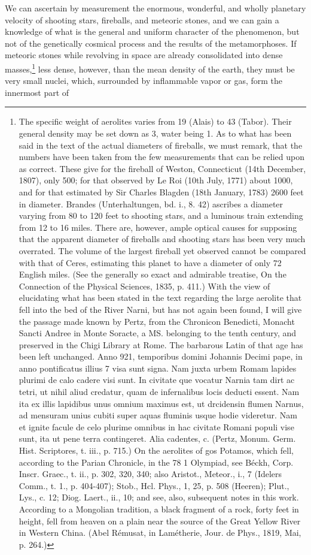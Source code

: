 We can ascertain by measurement the enormous, wonderful, and wholly planetary velocity of shooting stars, fireballs, and meteoric stones, and we can gain a knowledge of what is the general and uniform character of the phenomenon, but not of the genetically cosmical process and the results of the metamorphoses. If meteoric stones while revolving in space are already consolidated into dense masses,\footnote{The specific weight of aerolites varies from 19 (Alais) to 43 (Tabor). Their general density may be set down as 3, water being 1. As to what has been said in the text of the actual diameters of fireballs, we must remark, that the numbers have been taken from the few measurements that can be relied upon as correct. These give for the fireball of Weston, Connecticut (14th December, 1807), only 500; for that observed by Le Roi (10th July, 1771) about 1000, and for that estimated by Sir Charles Blagden (18th January, 1783) 2600 feet in diameter. Brandes (Unterhaltungen, bd. i., 8. 42) ascribes a diameter varying from 80 to 120 feet to shooting stars, and a luminous train extending from 12 to 16 miles. There are, however, ample optical causes for supposing that the apparent diameter of fireballs and shooting stars has been very much overrated. The volume of the largest fireball yet observed cannot be compared with that of Ceres, estimating this planet to have a diameter of only 72 English miles. (See the generally so exact and admirable treatise, On the Connection of the Physical Sciences, 1835, p. 411.) With the view of elucidating what has been stated in the text regarding the large aerolite that fell into the bed of the River Narni, but has not again been found, I will give the passage made known by Pertz, from the Chronicon Benedicti, Monacht Sancti Andree in Monte Soracte, a MS. belonging to the tenth century, and preserved in the Chigi Library at Rome. The barbarous Latin of that age has been left unchanged. Anno 921, temporibus domini Johannis Decimi pape, in anno pontificatus illius 7 visa sunt signa. Nam juxta urbem Romam lapides plurimi de calo cadere visi sunt. In civitate que vocatur Narnia tam dirt ac tetri, ut nihil aliud credatur, quam de infernalibus locis deducti essent. Nam ita ex illis lapidibus unus omnium maximus est, ut drcidensin flumen Narnus, ad mensuram unius cubiti super aquas fluminis usque hodie videretur. Nam et ignite facule de celo plurime omnibus in hac civitate Romani populi vise sunt, ita ut pene terra contingeret. Alia cadentes, c. (Pertz, Monum. Germ. Hist. Scriptores, t. iii., p. 715.) On the aerolites of gos Potamos, which fell, according to the Parian Chronicle, in the 78 1 Olympiad, see Béckh, Corp. Inscr. Graec., t. ii., p. 302, 320, 340; also Aristot., Meteor., i., 7 (Idelers Comm., t. 1., p. 404-407); Stob., Hcl. Phys., 1, 25, p. 508 (Heeren); Plut., Lys., c. 12; Diog. Laert., ii., 10; and see, also, subsequent notes in this work. According to a Mongolian tradition, a black fragment of a rock, forty feet in height, fell from heaven on a plain near the source of the Great Yellow River in Western China. (Abel Rémusat, in Lamétherie, Jour. de Phys., 1819, Mai, p. 264.)} less dense, however, than the mean density of the earth, they must be very small nuclei, which, surrounded by inflammable vapor or gas, form the innermost part of 